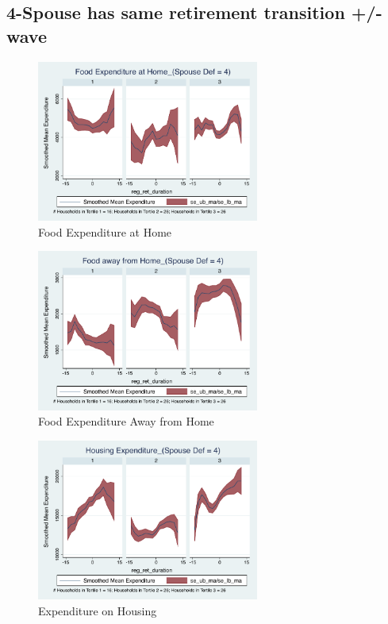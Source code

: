 \documentclass[11pt,onecolumn]{article}
\numberwithin{figure}{section}
\begin{document}
\clearpage

\subsection{4-Spouse has same retirement transition +/- wave}

\begin{figure}[h]
	\caption{Food Expenditure at Home}
	\centering
	\includegraphics[width=0.65\textwidth]{../ConsumptionPostRetirement_by_SpouseDef_Cats/Smoothed/4/spouse_def_total_foodexp_home_real.pdf}
\end{figure}


\begin{figure}[h]
	\caption{Food Expenditure Away from Home}
	\centering
	\includegraphics[width=0.65\textwidth]{../ConsumptionPostRetirement_by_SpouseDef_Cats/Smoothed/4/spouse_def_total_foodexp_away_real.pdf}
\end{figure}

\clearpage

\begin{figure}[h]
	\caption{Expenditure on Housing}
	\centering
	\includegraphics[width=0.65\textwidth]{../ConsumptionPostRetirement_by_SpouseDef_Cats/Smoothed/4/spouse_def_total_housing_real.pdf}
\end{figure}
\end{document}
